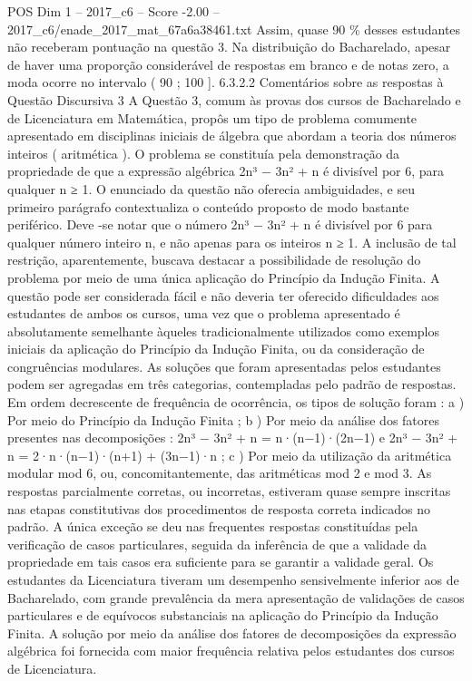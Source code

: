 \begin{textsample}{POS Dim 1 – 2017\_c6 – Score -2.00 – 2017\_c6/enade\_2017\_mat\_67a6a38461.txt}
Assim, quase 90 \% desses estudantes não receberam pontuação na questão 3.
Na distribuição do Bacharelado, apesar de haver uma proporção considerável de respostas em branco e de notas zero, a moda ocorre no intervalo ( 90 ; 100 ]. 6.3.2.2 Comentários sobre as respostas à Questão Discursiva 3 A Questão 3, comum às provas dos cursos de Bacharelado e de Licenciatura em Matemática, propôs um tipo de problema comumente apresentado em disciplinas iniciais de álgebra que abordam a teoria dos números inteiros ( aritmética ).
O problema se constituía pela demonstração da propriedade de que a expressão algébrica 2n³ − 3n² + n é divisível por 6, para qualquer n ≥ 1.
O enunciado da questão não oferecia ambiguidades, e seu primeiro parágrafo contextualiza o conteúdo proposto de modo bastante periférico.
Deve -se notar que o número 2n³ − 3n² + n é divisível por 6 para qualquer número inteiro n, e não apenas para os inteiros n ≥ 1.
A inclusão de tal restrição, aparentemente, buscava destacar a possibilidade de resolução do problema por meio de uma única aplicação do Princípio da Indução Finita.
A questão pode ser considerada fácil e não deveria ter oferecido dificuldades aos estudantes de ambos os cursos, uma vez que o problema apresentado é absolutamente semelhante àqueles tradicionalmente utilizados como exemplos iniciais da aplicação do Princípio da Indução Finita, ou da consideração de congruências modulares.
As soluções que foram apresentadas pelos estudantes podem ser agregadas em três categorias, contempladas pelo padrão de respostas.
Em ordem decrescente de frequência de ocorrência, os tipos de solução foram : a ) Por meio do Princípio da Indução Finita ; b ) Por meio da análise dos fatores presentes nas decomposições : 2n³ − 3n² + n = n·(n−1)·(2n−1) e 2n³ − 3n² + n = 2·n·(n−1)·(n+1) + (3n−1)·n ; c ) Por meio da utilização da aritmética modular mod 6, ou, concomitantemente, das aritméticas mod 2 e mod 3.
As respostas parcialmente corretas, ou incorretas, estiveram quase sempre inscritas nas etapas constitutivas dos procedimentos de resposta correta indicados no padrão.
A única exceção se deu nas frequentes respostas constituídas pela verificação de casos particulares, seguida da inferência de que a validade da propriedade em tais casos era suficiente para se garantir a validade geral.
Os estudantes da Licenciatura tiveram um desempenho sensivelmente inferior aos de Bacharelado, com grande prevalência da mera apresentação de validações de casos particulares e de equívocos substanciais na aplicação do Princípio da Indução Finita.
A solução por meio da análise dos fatores de decomposições da expressão algébrica foi fornecida com maior frequência relativa pelos estudantes dos cursos de Licenciatura.

\end{textsample}
